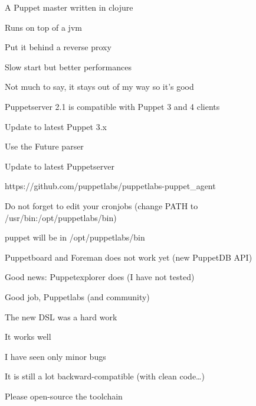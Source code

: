 
\begin{iframe}[Puppetserver]
\item A Puppet master written in clojure
\item Runs on top of a jvm
\item Put it behind a reverse proxy
\item Slow start but better performances
\item Not much to say, it stays out of my way so it's good
\item Puppetserver 2.1 is compatible with Puppet 3 and 4 clients
\end{iframe}
\begin{iframe}
\item Update to latest Puppet 3.x
\item Use the Future parser
\item Update to latest Puppetserver
\end{iframe}
\begin{iframe}
\item https://github.com/puppetlabs/puppetlabs-puppet\_agent
\item Do not forget to edit your cronjobs (change PATH to /usr/bin:/opt/puppetlabs/bin)
\item puppet will be in /opt/puppetlabs/bin
\end{iframe}
\begin{iframe}
\item Puppetboard and Foreman does not work yet (new PuppetDB API)
\item Good news: Puppetexplorer does (I have not tested)
\end{iframe}

\begin{iframe}
\item Good job, Puppetlabs (and community)
\item The new DSL was a hard work
\item It works well
\item I have seen only minor bugs
\item It is still a lot backward-compatible (with clean code\dots)
\item Please open-source the toolchain
\end{iframe}

